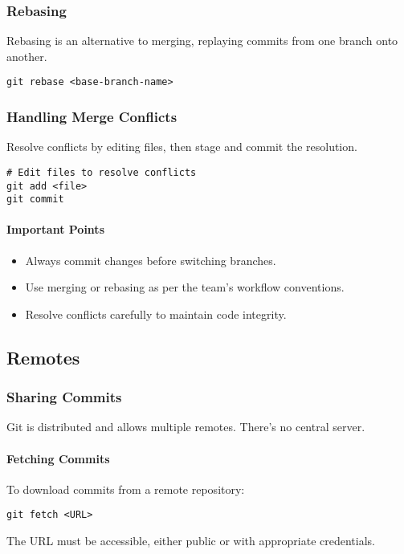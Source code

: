 \documentclass[12pt]{article}
\begin{document}
\subsubsection{Rebasing}
Rebasing is an alternative to merging, replaying commits from one branch onto another.
\begin{lstlisting}
git rebase <base-branch-name>
\end{lstlisting}

\subsubsection{Handling Merge Conflicts}
Resolve conflicts by editing files, then stage and commit the resolution.
\begin{lstlisting}
# Edit files to resolve conflicts
git add <file>
git commit
\end{lstlisting}


\paragraph{Important Points}
\begin{itemize}
    \item Always commit changes before switching branches.
    \item Use merging or rebasing as per the team's workflow conventions.
    \item Resolve conflicts carefully to maintain code integrity.
\end{itemize}

\subsection{Remotes}

\subsubsection{Sharing Commits}
Git is distributed and allows multiple remotes. There's no central server.

\paragraph{Fetching Commits}
To download commits from a remote repository:
\begin{lstlisting}
git fetch <URL>
\end{lstlisting}
The URL must be accessible, either public or with appropriate credentials.
\end{document}

